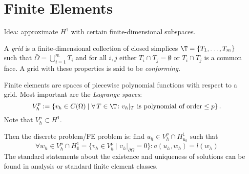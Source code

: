 \section{Finite Elements}
Idea: approximate $H^1$ with certain finite-dimensional subspaces.
\begin{definition}
	A \textit{grid} is a finite-dimensional collection of closed simplices $\T=\{ T_1,\ldots, T_m\}$ such that $\bar{\Omega}=\bigcup_{i=1}^mT_i$ and for all $i,j$ either $T_i\cap T_j=\emptyset$ or $T_i\cap T_j$ is a common face. A grid with these properties is said to be \textit{conforming}.
\end{definition}
Finite elements are spaces of piecewise polynomial functions with respect to a grid. Most important are the \textit{Lagrange spaces}:
\begin{equation*}
  V_h^p := \left\{v_h\in C(\Omega)\mid\forall\, T\in\T\colon v_h|_T\text{ is polynomial of order}\leq p\right\}.
\end{equation*}
Note that $V_h^p\subset H^1$.

Then the discrete problem/FE problem is: find $u_h\in V_h^p\cap H^1_{u_0}$ such that
\begin{equation*}
	\forall w_h\in V_h^p\cap H_0^1=\{ v_h\in V_h^p\mid v_h|_{\partial\Omega}=0\}\colon a(u_h,w_h)=l(w_h)
\end{equation*}
The standard statements about the existence and uniqueness of solutions can be found in analysis or standard finite element classes.
